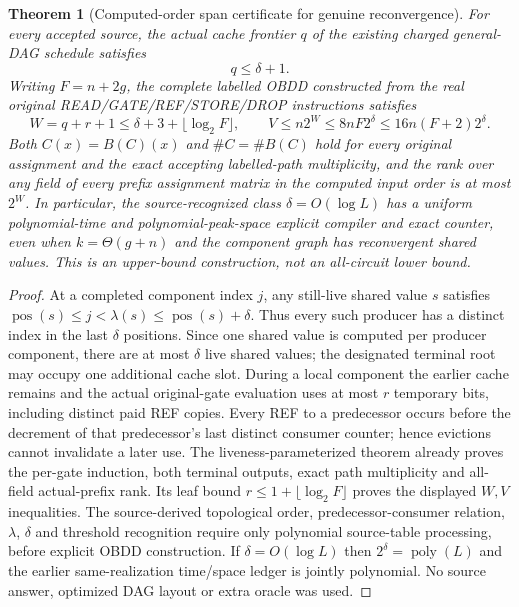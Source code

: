 \documentclass[11pt]{article}
\newtheorem{theorem}{Theorem}
\begin{document}
\begin{theorem}[Computed-order span certificate for genuine reconvergence]
For every accepted source, the actual cache frontier $q$ of the existing charged general-DAG schedule satisfies
\[
 q\le\delta+1.
\]
Writing $F=n+2g$, the complete labelled OBDD constructed from the real original READ/GATE/REF/STORE/DROP instructions satisfies
\[
 W=q+r+1\le\delta+3+\lfloor\log_2 F\rfloor,\qquad
 V\le n2^W\le 8nF2^\delta\le16n(F+2)2^\delta.
\]
Both $C(x)=B(C)(x)$ and $\#C=\#B(C)$ hold for every original assignment and the exact accepting labelled-path multiplicity, and the rank over any field of every prefix assignment matrix in the computed input order is at most $2^W$. In particular, the source-recognized class $\delta=O(\log L)$ has a uniform polynomial-time and polynomial-peak-space \emph{explicit compiler and exact counter}, even when $k=\Theta(g+n)$ and the component graph has reconvergent shared values. This is an upper-bound construction, not an all-circuit lower bound.
\end{theorem}
\begin{proof}
At a completed component index $j$, any still-live shared value $s$ satisfies $\operatorname{pos}(s)\le j<\lambda(s)\le\operatorname{pos}(s)+\delta$. Thus every such producer has a distinct index in the last $\delta$ positions. Since one shared value is computed per producer component, there are at most $\delta$ live shared values; the designated terminal root may occupy one additional cache slot. During a local component the earlier cache remains and the actual original-gate evaluation uses at most $r$ temporary bits, including distinct paid REF copies. Every REF to a predecessor occurs before the decrement of that predecessor's last distinct consumer counter; hence evictions cannot invalidate a later use. The liveness-parameterized theorem already proves the per-gate induction, both terminal outputs, exact path multiplicity and all-field actual-prefix rank. Its leaf bound $r\le1+\lfloor\log_2 F\rfloor$ proves the displayed $W,V$ inequalities. The source-derived topological order, predecessor-consumer relation, $\lambda$, $\delta$ and threshold recognition require only polynomial source-table processing, before explicit OBDD construction. If $\delta=O(\log L)$ then $2^\delta=\operatorname{poly}(L)$ and the earlier same-realization time/space ledger is jointly polynomial. No source answer, optimized DAG layout or extra oracle was used.
\end{proof}
\end{document}
